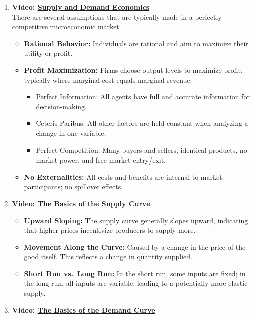\documentclass[
]{book}
\providecommand{\tightlist}{%
  \setlength{\itemsep}{0pt}\setlength{\parskip}{0pt}}
\begin{document}
\begin{enumerate}
\def\labelenumi{\arabic{enumi}.}
\tightlist
\item
  \textbf{Video: \href{ttps://www.bing.com/videos/riverview/relatedvideo?q=youtube+\%2b+assumptions+in+microeconomics&mid=9CED92F92F430E9D1F069CED92F92F430E9D1F06&FORM=VIRE}{Supply and Demand Economics}}\\
  There are several assumptions that are typically made in a perfectly competitive microeconomic market.

  \begin{itemize}
  \tightlist
  \item
    \textbf{Rational Behavior:} Individuals are rational and aim to maximize their utility or profit.
  \item
    \textbf{Profit Maximization:} Firms choose output levels to maximize profit, typically where marginal cost equals marginal revenue.

    \begin{itemize}
    \tightlist
    \item
      Perfect Information: All agents have full and accurate information for decision-making.
    \item
      Ceteris Paribus: All other factors are held constant when analyzing a change in one variable.
    \item
      Perfect Competition: Many buyers and sellers, identical products, no market power, and free market entry/exit.\\
    \end{itemize}
  \item
    \textbf{No Externalities:} All costs and benefits are internal to market participants; no spillover effects.
  \end{itemize}
\item
  \textbf{Video: \href{https://www.bing.com/videos/riverview/relatedvideo?&q=youtube+\%2b+the+basics+of+the+supply+curve&&mid=0B4E6D4CB20ADD15E9600B4E6D4CB20ADD15E960&&FORM=VRDGAR}{The Basics of the Supply Curve}}

  \begin{itemize}
  \tightlist
  \item
    \textbf{Upward Sloping:} The supply curve generally slopes upward, indicating that higher prices incentivize producers to supply more.
  \item
    \textbf{Movement Along the Curve:} Caused by a change in the price of the good itself. This reflects a change in quantity supplied.
  \item
    \textbf{Short Run vs.~Long Run:} In the short run, some inputs are fixed; in the long run, all inputs are variable, leading to a potentially more elastic supply.
  \end{itemize}
\item
  \textbf{Video: \href{https://www.youtube.com/watch?v=kUPm2tMCbGE}{The Basics of the Demand Curve}}


\end{enumerate}
\end{document}
